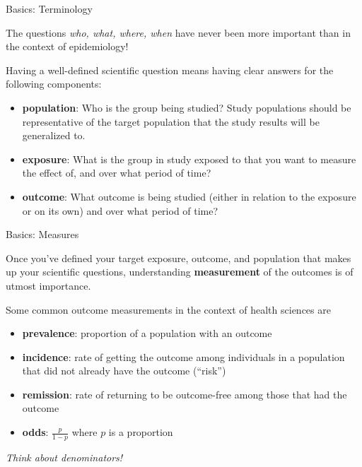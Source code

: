 \documentclass[ignorenonframetext,]{beamer}
\providecommand{\tightlist}{%
  \setlength{\itemsep}{0pt}\setlength{\parskip}{0pt}}
\begin{document}
\begin{frame}{Basics: Terminology}
\protect\hypertarget{basics-terminology}{}

The questions \emph{who, what, where, when} have never been more
important than in the context of epidemiology!

Having a well-defined scientific question means having clear answers for
the following components:

\begin{itemize}
\tightlist
\item
  \textbf{population}: Who is the group being studied? Study populations
  should be representative of the target population that the study
  results will be generalized to.
\item
  \textbf{exposure}: What is the group in study exposed to that you want
  to measure the effect of, and over what period of time?
\item
  \textbf{outcome}: What outcome is being studied (either in relation to
  the exposure or on its own) and over what period of time?
\end{itemize}

\end{frame}

\begin{frame}{Basics: Measures}
\protect\hypertarget{basics-measures}{}

Once you've defined your target exposure, outcome, and population that
makes up your scientific questions, understanding \textbf{measurement}
of the outcomes is of utmost importance.

Some common outcome measurements in the context of health sciences are

\begin{itemize}
\tightlist
\item
  \textbf{prevalence}: proportion of a population with an outcome
\item
  \textbf{incidence}: rate of getting the outcome among individuals in a
  population that did not already have the outcome (``risk'')
\item
  \textbf{remission}: rate of returning to be outcome-free among those
  that had the outcome
\item
  \textbf{odds}: \(\frac{p}{1 - p}\) where \(p\) is a proportion
\end{itemize}

\emph{Think about denominators!}

\end{frame}
\end{document}
